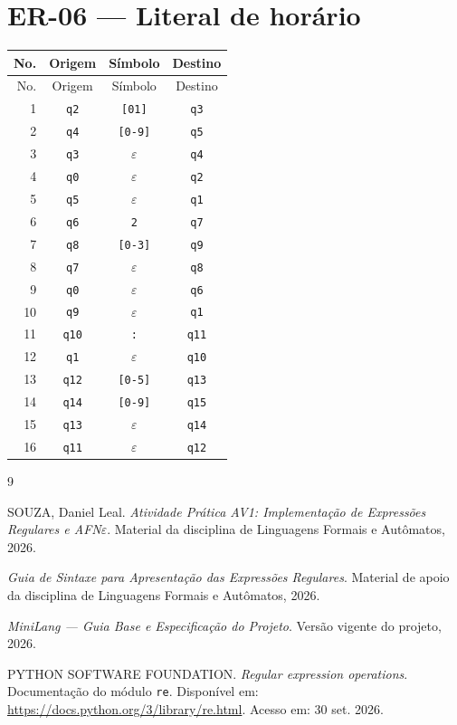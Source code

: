 \documentclass[12pt,a4paper,oneside]{report}
\begin{document}
\section{ER-06 --- Literal de horário}
\small
\begin{longtable}{|r|c|c|c|}
\toprule
No. & Origem & Símbolo & Destino \\
\midrule
\endfirsthead
\toprule
No. & Origem & Símbolo & Destino \\
\midrule
\endhead
1 & \texttt{q2} & \texttt{[01]} & \texttt{q3} \\
2 & \texttt{q4} & \texttt{[0-9]} & \texttt{q5} \\
3 & \texttt{q3} & $\varepsilon$ & \texttt{q4} \\
4 & \texttt{q0} & $\varepsilon$ & \texttt{q2} \\
5 & \texttt{q5} & $\varepsilon$ & \texttt{q1} \\
6 & \texttt{q6} & \texttt{2} & \texttt{q7} \\
7 & \texttt{q8} & \texttt{[0-3]} & \texttt{q9} \\
8 & \texttt{q7} & $\varepsilon$ & \texttt{q8} \\
9 & \texttt{q0} & $\varepsilon$ & \texttt{q6} \\
10 & \texttt{q9} & $\varepsilon$ & \texttt{q1} \\
11 & \texttt{q10} & \texttt{:} & \texttt{q11} \\
12 & \texttt{q1} & $\varepsilon$ & \texttt{q10} \\
13 & \texttt{q12} & \texttt{[0-5]} & \texttt{q13} \\
14 & \texttt{q14} & \texttt{[0-9]} & \texttt{q15} \\
15 & \texttt{q13} & $\varepsilon$ & \texttt{q14} \\
16 & \texttt{q11} & $\varepsilon$ & \texttt{q12} \\
\bottomrule
\end{longtable}


\renewcommand{\bibname}{Referências}
\begin{thebibliography}{9}
SOUZA, Daniel Leal. \textit{Atividade Prática AV1: Implementação de Expressões Regulares e AFN$\varepsilon$}. Material da disciplina de Linguagens Formais e Autômatos, 2026.

\textit{Guia de Sintaxe para Apresentação das Expressões Regulares}. Material de apoio da disciplina de Linguagens Formais e Autômatos, 2026.

\textit{MiniLang --- Guia Base e Especificação do Projeto}. Versão vigente do projeto, 2026.

PYTHON SOFTWARE FOUNDATION. \textit{Regular expression operations}. Documentação do módulo \texttt{re}. Disponível em: \url{https://docs.python.org/3/library/re.html}. Acesso em: 30 set. 2026.
\end{thebibliography}
\end{document}
